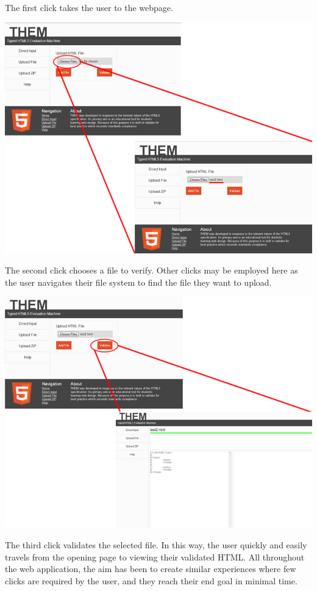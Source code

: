 \documentclass[10pt]{article}
\begin{document}
The first click takes the user to the webpage.

\includegraphics[scale=0.5]{click2.png}

The second click chooses a file to verify. Other clicks may be employed here as the user navigates their file system to find the file they want to upload.

\includegraphics[scale=0.5]{click3.png}

The third click validates the selected file. In this way, the user quickly and easily travels from the opening page to viewing their validated HTML. All throughout the web application, the aim has been to create similar experiences where few clicks are required by the user, and they reach their end goal in minimal time.
\end{document}
